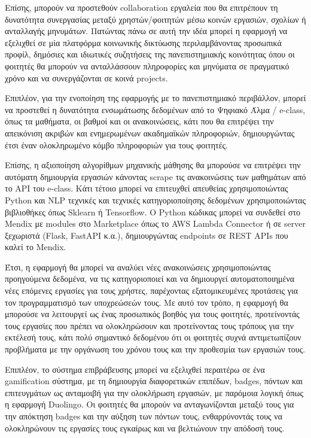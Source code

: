         Επίσης, μπορούν να προστεθούν collaboration εργαλεία που θα επιτρέπουν τη δυνατότητα συνεργασίας μεταξύ χρηστών/φοιτητών μέσω κοινών εργασιών, σχολίων ή ανταλλαγής μηνυμάτων. Πατώντας πάνω σε αυτή την ιδέα μπορεί η εφαρμογή να εξελιχθεί σε μία πλατφόρμα κοινωνικής δικτύωσης περιλαμβάνοντας προσωπικά προφίλ, δημόσιες και ιδιωτικές συζητήσεις της πανεπιστημιακής κοινότητας όπου οι φοιτητές θα μπορούν να ανταλλάσσουν πληροφορίες και μηνύματα σε πραγματικό χρόνο και να συνεργάζονται σε κοινά projects.

        Επιπλέον, για την ενοποίηση της εφαρμογής με το πανεπιστημιακό περιβάλλον, μπορεί να προστεθεί η δυνατότητα ενσωμάτωσης δεδομένων από το Ψηφιακό Άλμα / e-class, όπως τα μαθήματα, οι βαθμοί και οι ανακοινώσεις, κάτι που θα επιτρέψει την απεικόνιση ακριβών και ενημερωμένων ακαδημαϊκών πληροφοριών, δημιουργώντας έτσι έναν ολοκληρωμένο κόμβο πληροφοριών για τους φοιτητές.

        Επίσης, η αξιοποίηση αλγορίθμων μηχανικής μάθησης θα μπορούσε να επιτρέψει την αυτόματη δημιουργία εργασιών κάνοντας scrape τις ανακοινώσεις των μαθημάτων από το API του e-class. Κάτι τέτοιο μπορεί να επιτευχθεί απευθείας χρησιμοποιώντας Python και NLP τεχνικές και τεχνικές κατηγοριοποίησης δεδομένων χρησιμοποιώντας βιβλιοθήκες όπως Sklearn ή Tensorflow. Ο Python κώδικας μπορεί να συνδεθεί στο Mendix με modules στο Marketplace όπως το AWS Lambda Connector ή σε server ξεχωριστά (Flask, FastAPI κ.α.), δημιουργώντας endpoints σε REST APIs που καλεί το Mendix.

        Έτσι, η εφαρμογή θα μπορεί να αναλύει νέες ανακοινώσεις χρησιμοποιώντας προηγούμενα δεδομένα, να τις κατηγοριοποιεί και να δημιουργεί αυτοματοποιημένα νέες επόμενες εργασίες για τους χρήστες, παρέχοντας εξατομικευμένες προτάσεις για τον προγραμματισμό των υποχρεώσεών τους. Με αυτό τον τρόπο, η εφαρμογή θα μπορούσε να λειτουργεί ως ένας προσωπικός βοηθός για τους φοιτητές, προτείνοντάς τους εργασίες που πρέπει να ολοκληρώσουν και προτείνοντας τους τρόπους για την εκτέλεσή τους, κάτι πολύ σημαντικό δεδομένου ότι οι φοιτητές συχνά αντιμετωπίζουν προβλήματα με την οργάνωση του χρόνου τους και την προθεσμία των εργασιών τους.

        Επιπλέον, το σύστημα επιβράβευσης μπορεί να εξελιχθεί περαιτέρω σε ένα gamification σύστημα, με τη δημιουργία διαφορετικών επιπέδων, badges, πόντων και επιτευγμάτων ως ανταμοιβή για την ολοκλήρωση εργασιών, με παρόμοια λογική όπως η εφαρμογή Duolingo. Οι φοιτητές θα μπορούν να ανταγωνίζονται μεταξύ τους για την απόκτηση badges και την αύξηση των πόντων τους, ενθαρρύνοντάς τους να ολοκληρώνουν τις εργασίες τους εγκαίρως και να βελτιώνουν την απόδοσή τους.

